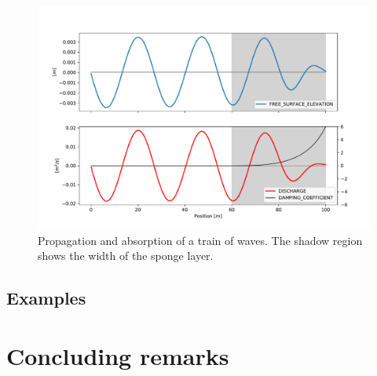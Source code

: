 \begin{figure}
    \centering
    \includegraphics[width=.8\textwidth]{img/absorbing_boundary/absorbing_boundary.pdf}
    \caption{Propagation and absorption of a train of waves. The shadow region shows the width of the sponge layer.}
    \label{absorbing_boundary}
\end{figure}


\subsection{Examples}



\section{Concluding remarks}


